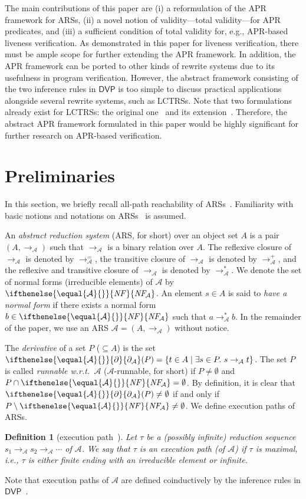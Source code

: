 \documentclass[10pt,a4paper]{article}
\newtheorem{definition}[theorem]{Definition}
\def\cA{\mathcal{A}}
\def\cR{\mathcal{R}}
\newcommand{\NF}[1][]{\ifthenelse{\equal{#1}{}}{\mathit{NF}}{\mathit{NF\!}_{#1}}}
\newcommand{\Derivative}[1][\cR]{\ifthenelse{\equal{#1}{}}{\partial}{\partial_{#1}}}
\newcommand{\DVP}[1][]{\mathsf{DVP}}
\begin{document}
The main contributions of this paper are
(i)
a reformulation of the APR framework for ARSs,
(ii)
a novel notion of validity---total validity---for APR predicates,
and
(iii)
a sufficient condition of total validity for, e.g., APR-based liveness verification.
As demonstrated in this paper for liveness verification, there must be ample scope for further extending the APR framework.
In addition, the APR framework can be ported to other kinds of rewrite systems due to its usefulness in program verification.
However, the abstract framework consisting of the two inference rules in $\DVP$ is too simple to discuss practical applications alongside several rewrite systems, such as LCTRSs.
Note that two formulations already exist for LCTRSs:
the original one~\cite{KN13frocos} and its extension~\cite{CL18}.
Therefore, the abstract APR framework formulated in this paper would be highly significant for further research on APR-based verification.

\setcounter{section}{1}
\section{Preliminaries}
\label{sec:preliminaries}

In this section, we briefly recall all-path reachability of ARSs~\cite{CL18}.
Familiarity with basic notions and notations on ARSs~\cite{BN98,Ohl02} is assumed.

An \emph{abstract reduction system} (ARS, for short) over an object set $A$ is a pair $(A,\to_\cA)$ such that $\to_\cA$ is a binary relation over $A$.
The reflexive closure of $\to_\cA$ is denoted by $\to_\cA^=$,
the transitive closure of $\to_\cA$ is denoted by $\to_\cA^+$, and
the reflexive and transitive closure of $\to_\cA$ is denoted by $\to_\cA^*$.
We denote the set of normal forms (irreducible elements) of $\cA$ by $\NF[\cA]$.
An element $s \in A$ is said to \emph{have a normal form} if there exists a normal form $b \in \NF[\cA]$ such that $a \mathrel{\to_\cA^*} b$.
In the remainder of the paper, we use an ARS $\cA = (A,\to_\cA)$ without notice.

The \emph{derivative} of a set $P$ ($\subseteq A$) is the set $\Derivative[\cA](P) = \{ t \in A \mid \exists s \in P.\ s \to_\cA t \}$.
The set $P$ is called \emph{runnable w.r.t.\ $\cA$} ($\cA$-runnable, for short) if $P\ne \emptyset$ and $P \cap \NF[\cA] = \emptyset$.
By definition, it is clear that $\Derivative[\cA](P)\ne\emptyset$ if and only if $P \setminus \NF[\cA] \ne \emptyset$.
We define execution paths of ARSs.
\begin{definition}[execution path~\cite{CL18}]
	Let $\tau$ be a (possibly infinite) reduction sequence $s_1 \to_\cA s_2 \to_\cA \cdots$  of $\cA$.
	We say that $\tau$ is an \emph{execution path} (of $\cA$) if $\tau$ is maximal, i.e., $\tau$ is either finite ending with an irreducible element or infinite.
\end{definition}
Note that execution paths of $\cA$ are defined coinductively by the inference rules in $\DVP$~\cite{CL18}.
\end{document}
